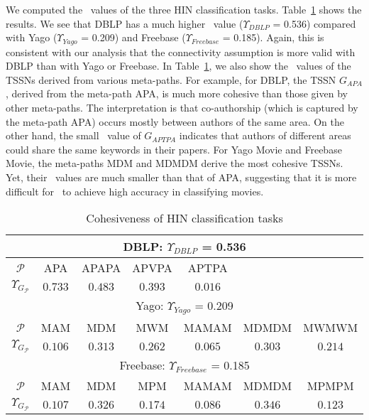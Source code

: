 We computed the \chn\ values of the three HIN classification tasks. Table~\ref{table:chn} shows the results.
We see that  DBLP has a much higher \chn\ value ($\Upsilon_{\mathit{DBLP}}$ = 0.536) 
compared with Yago ($\Upsilon_{\mathit{Yago}}$ = 0.209) and Freebase ($\Upsilon_{\mathit{Freebase}}$ = 0.185).
Again, this is consistent with our analysis that the connectivity assumption is more valid 
with DBLP than with Yago or Freebase. 
In Table~\ref{table:chn}, we also show the \chn\ values of the TSSNs derived from various meta-paths. 
For example, 
for DBLP, the TSSN $G_{\mathit{APA}}$, derived from the meta-path APA, is much more cohesive than
those given by other meta-paths. 
The interpretation is that co-authorship (which is captured by the meta-path APA) 
occurs mostly between authors of the same area. 
On the other hand, the small \chn\ value of $G_{\mathit{APTPA}}$ indicates that
authors of different areas could share the same keywords in their papers. 
For Yago Movie and Freebase Movie,
the meta-paths MDM and MDMDM derive the most cohesive TSSNs. 
Yet, their \chn\ values are much smaller than that of APA,
suggesting that it is more difficult for \tc\ to achieve high accuracy in classifying movies.


\begin{table}
\centering
\caption{Cohesiveness of HIN classification tasks}
\tiny
\begin{tabular}{|c|c|c|c|c|c|c|}  \hline
\multicolumn{7}{|c|}{DBLP: $\Upsilon_{\mathit{DBLP}}$ = 0.536} \\ \hline
$\mathcal{P}$ & APA & APAPA & APVPA & APTPA  & & \\ \hline
$\Upsilon_{G_\mathcal{P}}$ & $0.733$ & $0.483$ & $0.393$ & $0.016$ & & \\ \hline \hline
\multicolumn{7}{|c|}{Yago: $\Upsilon_{\mathit{Yago}}$ = 0.209} \\ \hline
$\mathcal{P}$ & MAM & MDM & MWM & MAMAM  & MDMDM & MWMWM  \\ \hline
$\Upsilon_{G_\mathcal{P}}$ & $0.106$ & $0.313$ & $0.262$ & $0.065$ & $0.303$ & $0.214$  \\ \hline \hline
\multicolumn{7}{|c|}{Freebase: $\Upsilon_{\mathit{Freebase}}$ = 0.185 } \\ \hline
$\mathcal{P}$ & MAM & MDM & MPM & MAMAM & MDMDM & MPMPM \\ \hline
$\Upsilon_{G_\mathcal{P}}$ & $0.107$ & $0.326$ & $0.174$ & $0.086$ & $0.346$ & $0.123$ \\ \hline
\end{tabular}
\label{table:chn}
\end{table}


